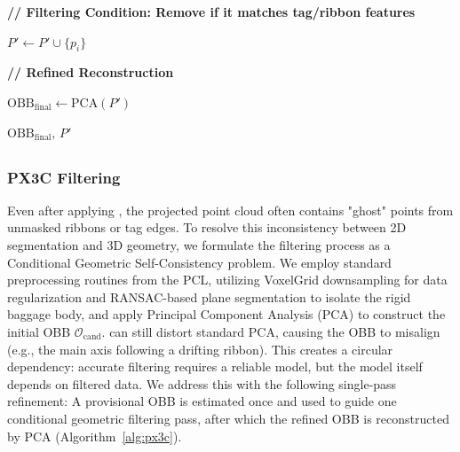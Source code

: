 \begin{algorithm}[t]
\begin{algorithmic}[1]
    \State \textbf{// Filtering Condition: Remove if it matches tag/ribbon features}


        \State $P' \gets P' \cup \{p_i\}$

    \EndIf

\EndFor

\State \textbf{// Refined Reconstruction}

\State $\mathrm{OBB}_{\text{final}} \gets \mathrm{PCA}(P')$

\State \Return $\mathrm{OBB}_{\text{final}},\,P'$

\end{algorithmic}
\end{algorithm}

\subsection{}
\subsubsection{PX3C Filtering}
Even after applying , the projected point cloud often contains "ghost" points from unmasked ribbons or tag edges. To resolve this inconsistency between 2D segmentation and 3D geometry, we formulate the filtering process as a Conditional Geometric Self-Consistency problem. We employ standard preprocessing routines from the PCL, utilizing VoxelGrid downsampling for data regularization and RANSAC-based plane segmentation to isolate the rigid baggage body, and apply Principal Component Analysis (PCA) to construct the initial OBB $\mathcal{O}_{\text{cand}}$.  can still distort standard PCA, causing the OBB to misalign (e.g., the main axis following a drifting ribbon). This creates a circular dependency: accurate filtering requires a reliable model, but the model itself depends on filtered data. We address this with the following single-pass refinement: A provisional OBB is estimated once and used to guide one conditional geometric filtering pass, after which the refined OBB is reconstructed by PCA (Algorithm~\ref{alg:px3c}).

